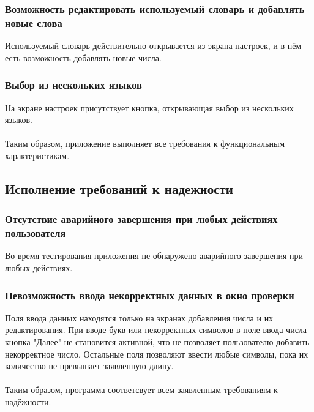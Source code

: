 \documentclass[draft]{article}
\begin{document}
\subsubsection{Возможность редактировать используемый словарь и добавлять новые слова}
Используемый словарь действительно открывается из экрана настроек, и в нём есть возможность добавлять новые числа.
\subsubsection{Выбор из нескольких языков}
На экране настроек присутствует кнопка, открывающая выбор из нескольких языков.\\
~\\
Таким образом, приложение выполняет все требования к функциональным характеристикам.
\subsection{Исполнение требований к надежности}
\subsubsection{Отсутствие аварийного завершения при любых действиях пользователя}
Во время тестирования приложения не обнаружено аварийного завершения при любых действиях.
\subsubsection{Невозможность ввода некорректных данных в окно проверки}
Поля ввода данных находятся только на экранах добавления числа и их редактирования. При вводе букв или некорректных символов в поле ввода числа кнопка "{}Далее"{} не становится активной, что не позволяет пользователю добавить некорректное число. Остальные поля позволяют ввести любые символы, пока их количество не превышает заявленную длину.\\
~\\
Таким образом, программа соответсвует всем заявленным требованиям к надёжности.
\newpage
{}
\end{document}
